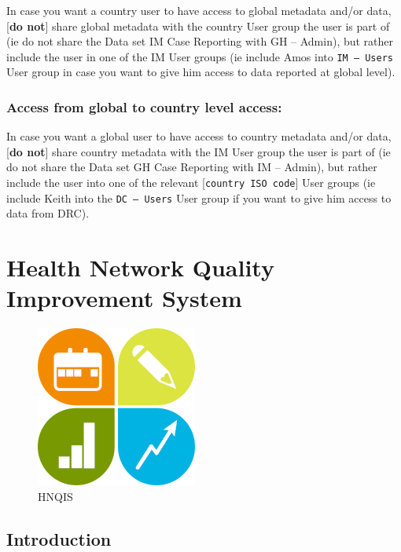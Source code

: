 \documentclass[]{book}
\begin{document}
In case you want a country user to have access to global metadata and/or data, {[}\textbf{do not}{]} share global metadata with the country User group the user is part of (ie do not share the Data set IM Case Reporting with GH -- Admin), but rather include the user in one of the IM User groups (ie include Amos into \texttt{IM\ –\ Users} User group in case you want to give him access to data reported at global level).

\hypertarget{access-from-global-to-country-level-access}{%
\subsection{Access from global to country level access:}\label{access-from-global-to-country-level-access}}

In case you want a global user to have access to country metadata and/or data, {[}\textbf{do not}{]} share country metadata with the IM User group the user is part of (ie do not share the Data set GH Case Reporting with IM -- Admin), but rather include the user into one of the relevant {[}\texttt{country\ ISO\ code}{]} User groups (ie include Keith into the \texttt{DC\ –\ Users} User group if you want to give him access to data from DRC).

\hypertarget{hnqis}{%
\chapter{Health Network Quality Improvement System}\label{hnqis}}

\begin{figure}
\centering
\includegraphics{images/hnqis.png}
\caption{HNQIS}
\end{figure}

\hypertarget{introduction-4}{%
\section{Introduction}\label{introduction-4}}
\end{document}
